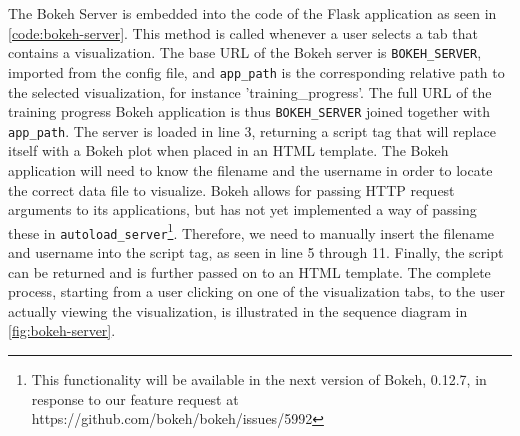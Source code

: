 \noindent The Bokeh Server is embedded into the code of the Flask application as seen in \autoref{code:bokeh-server}. This method is called whenever a user selects a tab that contains a visualization. The base URL of the Bokeh server is \texttt{BOKEH\_SERVER}, imported from the config file, and \texttt{app\_path} is the corresponding relative path to the selected visualization, for instance 'training\_progress'. The full URL of the training progress Bokeh application is thus \texttt{BOKEH\_SERVER} joined together with \texttt{app\_path}. The server is loaded in line 3, returning a script tag that will replace itself with a Bokeh plot when placed in an HTML template. The Bokeh application will need to know the filename and the username in order to locate the correct data file to visualize. Bokeh allows for passing HTTP request arguments to its applications, but has not yet implemented a way of passing these in \texttt{autoload\_server}\footnote{This functionality will be available in the next version of Bokeh, 0.12.7, in response to our feature request at https://github.com/bokeh/bokeh/issues/5992}. Therefore, we need to manually insert the filename and username into the script tag, as seen in line 5 through 11. Finally, the script can be returned and is further passed on to an HTML template. The complete process, starting from a user clicking on one of the visualization tabs, to the user actually viewing the visualization, is illustrated in the sequence diagram in \autoref{fig:bokeh-server}.




